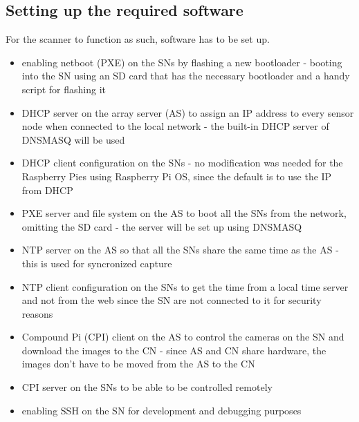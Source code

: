\subsection{Setting up the required software}
	For the scanner to function as such, software has to be set up.
	\begin{itemize}
		\item enabling netboot (PXE) on the SNs by flashing a new bootloader - booting into the SN using an SD card that has the necessary bootloader and a handy script for flashing it
		\item DHCP server on the array server (AS) to assign an IP address to every sensor node when connected to the local network - the built-in DHCP server of DNSMASQ will be used
		\item DHCP client configuration on the SNs - no modification was needed for the Raspberry Pies using Raspberry Pi OS, since the default is to use the IP from DHCP
		\item PXE server and file system on the AS to boot all the SNs from the network, omitting the SD card - the server will be set up using DNSMASQ
		\item NTP server on the AS so that all the SNs share the same time as the AS - this is used for syncronized capture
		\item NTP client configuration on the SNs to get the time from a local time server and not from the web since the SN are not connected to it for security reasons
		\item Compound Pi (CPI) client on the AS to control the cameras on the SN and download the images to the CN - since AS and CN share hardware, the images don't have to be moved from the AS to the CN
		\item CPI server on the SNs to be able to be controlled remotely
		\item enabling SSH on the SN for development and debugging purposes
	\end{itemize}
	
